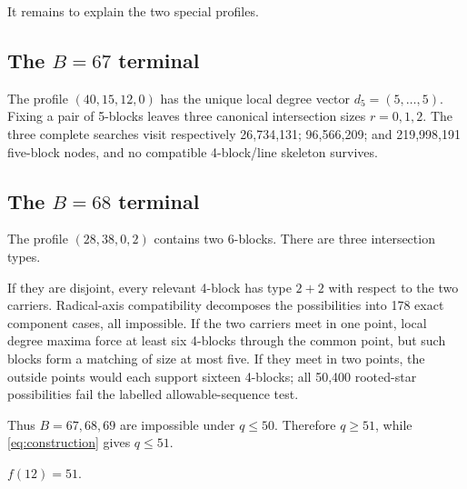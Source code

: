 It remains to explain the two special profiles.

\subsection{The $B=67$ terminal}
The profile $(40,15,12,0)$ has the unique local degree vector $d_5=(5,\ldots,5)$.  Fixing a pair of 5-blocks leaves three canonical intersection sizes $r=0,1,2$.  The three complete searches visit respectively 26,734,131; 96,566,209; and 219,998,191 five-block nodes, and no compatible 4-block/line skeleton survives.

\subsection{The $B=68$ terminal}
The profile $(28,38,0,2)$ contains two 6-blocks.  There are three intersection types.

If they are disjoint, every relevant 4-block has type $2+2$ with respect to the two carriers.  Radical-axis compatibility decomposes the possibilities into 178 exact component cases, all impossible.  If the two carriers meet in one point, local degree maxima force at least six 4-blocks through the common point, but such blocks form a matching of size at most five.  If they meet in two points, the outside points would each support sixteen 4-blocks; all 50,400 rooted-star possibilities fail the labelled allowable-sequence test.

Thus $B=67,68,69$ are impossible under $q\le50$.  Therefore $q\ge51$, while \cref{eq:construction} gives $q\le51$.

\begin{theorem}\label{thm:n12}
$f(12)=51$.
\end{theorem}

